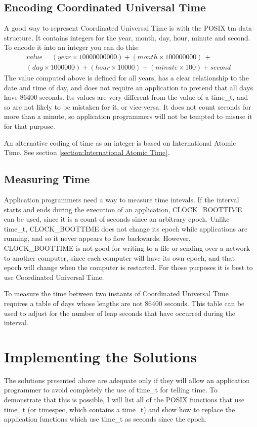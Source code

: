 \documentclass[letterpaper,twoside]{article}
\begin{document}
\subsection{Encoding Coordinated Universal Time}
A good way to represent Coordinated Universal Time is with the
POSIX {\ttfamily tm} data
structure.  It contains integers for the year, month, day, hour, minute
and second.  To encode it into an integer you can do this:
\begin{multline*}
  value = (year \times 10000000000) + (month \times 100000000) \,+ \\
  (day \times 1000000) + (hour \times 10000) + (minute \times 100) + second
\end{multline*}
The value computed above is defined for all years, has a clear relationship
to the date and time of day, and does not require an application to pretend
that all days have \num{86400} seconds.  Its values are very different from
the value of a {\ttfamily time\_t}, and so are not likely to be mistaken for it,
or vice-versa.  It does not count seconds for more than a minute, so
application programmers will not be tempted to misuse it for that purpose.

An alternative coding of time as an integer is based on International
Atomic Time.  See section \ref{section:International Atomic Time}.

\subsection{Measuring Time}
Application programmers need a way to measure time intevals.
If the interval starts and ends during the execution of an application,
CLOCK\_BOOTTIME
can be used, since it is a count of seconds since an arbitrary epoch.
Unlike {\ttfamily time\_t}, CLOCK\_BOOTTIME does not change its epoch while
applications are running, and so it never appears to flow
backwards.  However, CLOCK\_BOOTTIME is not good for writing to a file
or sending
over a network to another computer, since each computer will have
its own epoch, and that epoch will change when the computer is restarted.
For those purposes it is best to use Coordinated Universal Time.

To measure the time between two instants of Coordinated Universal Time
requires a table of days whose lengths are not \num{86400} seconds.
This table
can be used to adjust for the number of leap seconds that have occurred
during the interval.

\section{Implementing the Solutions}
The solutions presented above are adequate only if they will allow an
application
programmer to avoid completely the use of {\ttfamily time\_t} for telling time.
To demonstrate that this is possible,
I will list all of the POSIX functions 
that use {\ttfamily time\_t}
(or timespec, which contains a {\ttfamily time\_t}) 
and show how to
replace the application functions which use {\ttfamily time\_t} as
seconds since the epoch.
\end{document}
